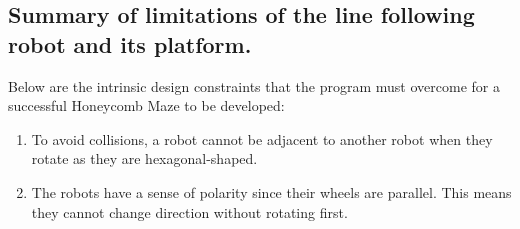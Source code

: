 \subsection{Summary of limitations of the line following robot and its platform.} 

Below are the intrinsic design constraints that the program must overcome for a successful Honeycomb Maze to be developed:
\begin{tcolorbox}
\begin{enumerate}
\item To avoid collisions, a robot cannot be adjacent to another robot when they rotate as they are hexagonal-shaped. 
\item The robots have a sense of polarity since their wheels are parallel. This means they cannot change direction without rotating first.
\end{enumerate}
\end{tcolorbox}


